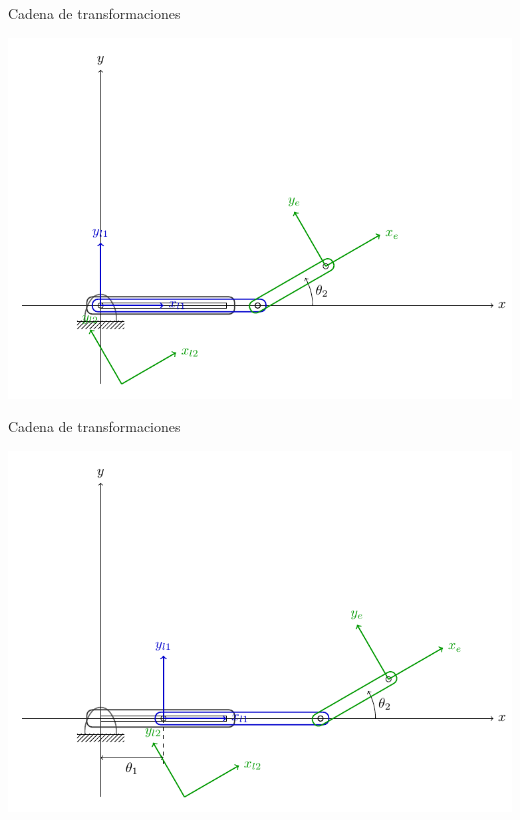 \documentclass[presentation,aspectratio=169]{beamer}
\begin{document}
\begin{frame}[label={sec:org840dfbd}]{Cadena de transformaciones}
\begin{center}
 \includegraphics[height=0.8\textheight]{../figures/2d-2dof-prismatic-revolute-prism0.pdf}
\end{center}
\end{frame}

\begin{frame}[label={sec:orga415710}]{Cadena de transformaciones}
\begin{center}
 \includegraphics[height=0.8\textheight]{../figures/2d-2dof-prismatic-revolute.pdf}
\end{center}
\end{frame}
\end{document}
